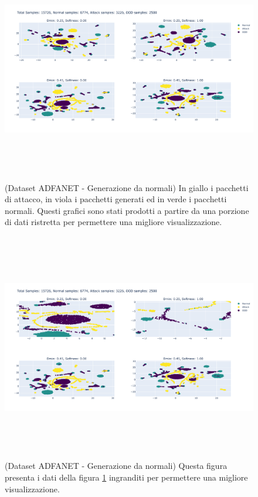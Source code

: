 \begin{figure}[htpb]
    \centering
    \includegraphics[width=\textwidth,height=10cm,keepaspectratio=true]{img/gen_test/adfa/ADFANET_normal_only_reduced_ood.png}
    \caption{
      (Dataset ADFANET - Generazione da normali) In giallo i pacchetti di attacco, in viola i pacchetti generati ed in verde i pacchetti normali. Questi grafici sono stati prodotti a partire da una porzione di dati ristretta per permettere una migliore visualizzazione.
    }
    \label{fig:gen_ADFA_norm_1}
\end{figure}


\begin{figure}[htpb]
    \centering
    \includegraphics[width=\textwidth,height=10cm,keepaspectratio=true]{img/gen_test/adfa/ADFANET_normal_only_reduced_ood_zoomed.png}
    \caption{
      (Dataset ADFANET - Generazione da normali) Questa figura presenta i dati della figura \ref{fig:gen_ADFA_norm_1} ingranditi per permettere una migliore visualizzazione.
    }
    \label{fig:gen_ADFA_norm_1_zoomed}
\end{figure}



